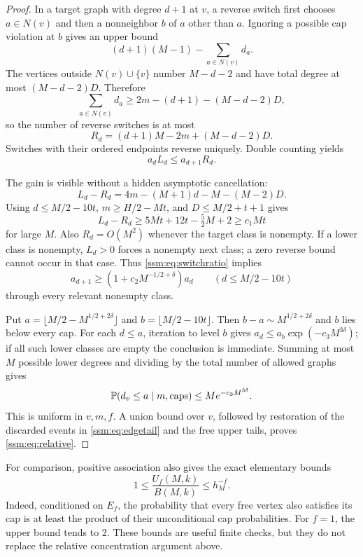 \begin{proof}
In a target graph with degree $d+1$ at $v$, a reverse switch first chooses $a\in N(v)$ and then a nonneighbor $b$ of $a$ other than $a$. Ignoring a possible cap violation at $b$ gives an upper bound
\[
 (d+1)(M-1)-\sum_{a\in N(v)}d_a.
\]
The vertices outside $N(v)\cup\{v\}$ number $M-d-2$ and have total degree at most $(M-d-2)D$. Therefore
\[
 \sum_{a\in N(v)}d_a\ge2m-(d+1)-(M-d-2)D,
\]
so the number of reverse switches is at most
\[
 R_d=(d+1)M-2m+(M-d-2)D.
\]
Switches with their ordered endpoints reverse uniquely. Double counting yields
\begin{equation}\label{ssm:eq:switchratio}
 a_dL_d\le a_{d+1}R_d.
\end{equation}

The gain is visible without a hidden asymptotic cancellation:
\[
 L_d-R_d=4m-(M+1)d-M-(M-2)D.
\]
Using $d\le M/2-10t$, $m\ge H/2-Mt$, and $D\le M/2+t+1$ gives
\begin{equation}\label{ssm:eq:switchgain}
 L_d-R_d\ge5Mt+12t-\tfrac52M+2\ge c_1Mt
\end{equation}
for large $M$. Also $R_d=O(M^2)$ whenever the target class is nonempty. If a lower class is nonempty, $L_d>0$ forces a nonempty next class; a zero reverse bound cannot occur in that case. Thus \eqref{ssm:eq:switchratio} implies
\[
 a_{d+1}\ge(1+c_2M^{-1/2+\delta})a_d
 \qquad(d\le M/2-10t)
\]
through every relevant nonempty class.

Put $a=\lfloor M/2-M^{1/2+2\delta}\rfloor$ and $b=\lfloor M/2-10t\rfloor$. Then $b-a\sim M^{1/2+2\delta}$ and $b$ lies below every cap. For each $d\le a$, iteration to level $b$ gives
$a_d\le a_b\exp(-c_3M^{3\delta})$; if all such lower classes are empty the conclusion is immediate. Summing at most $M$ possible lower degrees and dividing by the total number of allowed graphs gives
\[
 \mathbb P(d_v\le a\mid m,\text{caps})\le M e^{-c_3M^{3\delta}}.
\]
This is uniform in $v,m,f$. A union bound over $v$, followed by restoration of the discarded events in \eqref{ssm:eq:edgetail} and the free upper tails, proves \eqref{ssm:eq:relative}.
\end{proof}

For comparison, positive association also gives the exact elementary bounds
\begin{equation}\label{ssm:eq:FKGbound}
 1\le\frac{U_f(M,k)}{B(M,k)}\le h_M^{-f}.
\end{equation}
Indeed, conditioned on $E_f$, the probability that every free vertex also satisfies its cap is at least the product of their unconditional cap probabilities. For $f=1$, the upper bound tends to $2$. These bounds are useful finite checks, but they do not replace the relative concentration argument above.
